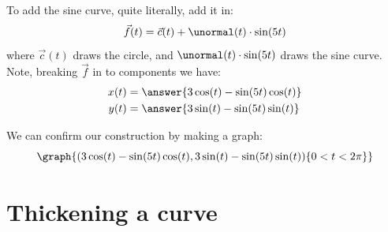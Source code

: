 \documentclass{ximera}
\begin{document}
\begin{example}
\begin{explanation}
\begin{image}
    \end{image}
    To add the sine curve, quite literally, add it in:
    \[
    \vec{f}(t) = \vec{c}(t) + \unormal(t)\cdot \sin(5t)
    \]
    where $\vec{c}(t)$ draws the circle, and $\unormal(t)\cdot
    \sin(5t)$ draws the sine curve. Note, breaking $\vec{f}$ in to components we have:
    \begin{align*}
      x(t) &= \answer{3\cos(t)-\sin(5t)\cos(t)}\\
      y(t) &= \answer{3\sin(t)-\sin(5t)\sin(t)}
    \end{align*}
    \begin{onlineOnly}
      We can confirm our construction by making a graph:
      \[
      \graph{(3\cos(t)-\sin(5t)\cos(t),3\sin(t)-\sin(5t)\sin(t))\{0<t<2\pi\}}
      \]
    \end{onlineOnly}
  \end{explanation}
\end{example}

\section{Thickening a curve}
\end{document}
